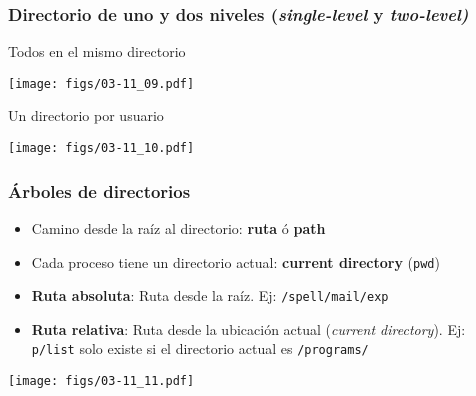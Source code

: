 \documentclass[letter]{beamer}
\begin{document}
\begin{frame}
  \frametitle{Directorio de uno y dos niveles ({\em single-level} y {\em two-level)}}

  Todos en el mismo directorio
  \begin{center}
    \texttt{[image: figs/03-11\_09.pdf]}
  \end{center}

  Un directorio por usuario
  \begin{center}
    \texttt{[image: figs/03-11\_10.pdf]}
  \end{center}

\end{frame}
\begin{frame}
  \frametitle{Árboles de directorios}

  \begin{itemize}
    \item Camino desde la raíz al directorio: {\bf ruta} ó {\bf path}
    \item Cada proceso tiene un directorio actual: {\bf current directory} ({\tt pwd})
    \item {\bf Ruta absoluta}: Ruta desde la raíz. Ej: {\tt /spell/mail/exp}
    \item {\bf Ruta relativa}: Ruta desde la ubicación actual ({\em current directory}).
          Ej: {\tt p/list} solo existe si el directorio actual es {\tt /programs/}
  \end{itemize}

  \begin{center}
    \texttt{[image: figs/03-11\_11.pdf]}
  \end{center}


\end{frame}
\end{document}
